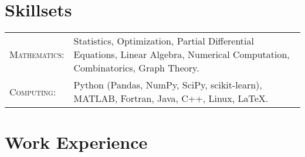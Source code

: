 \documentclass[letterpaper,10pt]{article} %
\begin{document}

\section{Skillsets}

\begin{center}
\begin{tabular}{R{4.25cm}L{11.25cm}}

\textsc{Mathematics:} & Statistics, Optimization, Partial Differential Equations, Linear Algebra, Numerical Computation, Combinatorics, Graph Theory.\\
\textsc{Computing:} & Python (Pandas, NumPy, SciPy, scikit-learn), MATLAB, Fortran, Java, C++, Linux, \LaTeX.

\end{tabular}
\end{center}


\section{Work Experience}
\end{document}
